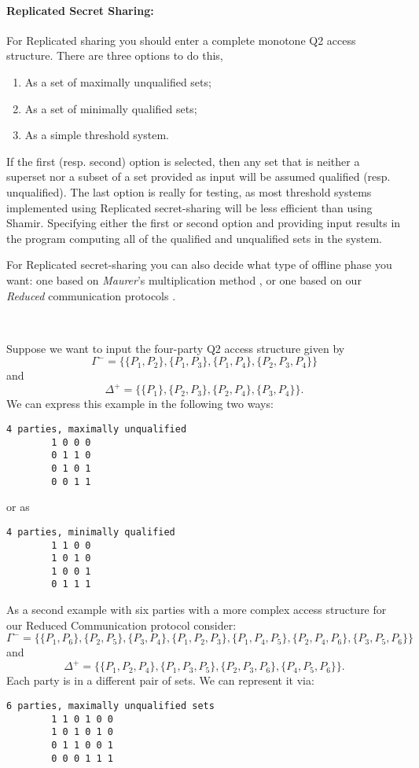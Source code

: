 \paragraph{Replicated Secret Sharing:}
For Replicated sharing you should enter a complete monotone Q2 access structure.
There are three options to do this,
\begin{enumerate}
\item As a set of maximally unqualified sets;
\item As a set of minimally qualified sets;
\item As a simple threshold system.
\end{enumerate}
If the first (resp. second) option is selected, then any set that is neither
a superset nor a subset of a set provided as input will be assumed qualified (resp. unqualified).
The last option is really for testing, as most
threshold systems implemented using Replicated secret-sharing will be
less efficient than using Shamir.
Specifying either the first or second option and providing input
results in the program computing all of the qualified and unqualified
sets in the system.

For Replicated secret-sharing you
can also decide what type of offline phase you want: one based on
{\em Maurer}'s multiplication method \cite{Maurer},
or one based on our {\em Reduced} communication protocols \cite{KRSW}.

~~

\noindent
Suppose we want to input the four-party Q2 access structure given by
\[\Gamma^- = \{\{P_1, P_2\}, \{P_1, P_3\}, \{P_1, P_4\}, \{P_2, P_3, P_4\}\}\]
and
\[\Delta^+ = \{\{P_1\}, \{P_2, P_3\}, \{P_2, P_4\}, \{P_3, P_4\}\}.\]
We can express this example in the following two ways:
\begin{verbatim}
4 parties, maximally unqualified
        1 0 0 0
        0 1 1 0
        0 1 0 1
        0 0 1 1
\end{verbatim}
or as
\begin{verbatim}
4 parties, minimally qualified
        1 1 0 0
        1 0 1 0
        1 0 0 1
        0 1 1 1
\end{verbatim}

\noindent
As a second example with six parties with a more complex
access structure for our Reduced Communication protocol consider:
\[\Gamma^- = \{\{P_1, P_6\}, \{P_2, P_5\}, \{P_3, P_4\}, \{P_1, P_2, P_3\}, \{P_1,
  P_4, P_5\}, \{P_2, P_4, P_6\}, \{P_3, P_5, P_6\}\}\]
and
\[\Delta^+ = \{\{P_1, P_2, P_4\}, \{P_1, P_3, P_5\}, \{P_2, P_3, P_6\}, \{P_4, P_5, P_6\}\}.\]
Each party is in a different pair of sets.  We can represent it via:
\begin{verbatim}
6 parties, maximally unqualified sets
        1 1 0 1 0 0
        1 0 1 0 1 0
        0 1 1 0 0 1
        0 0 0 1 1 1
\end{verbatim}

